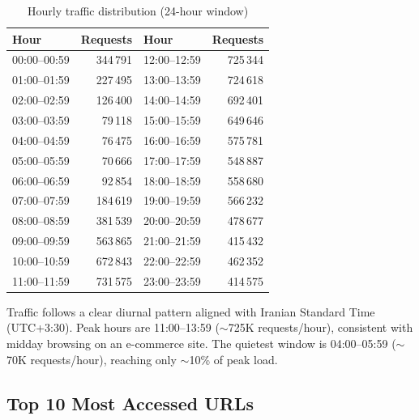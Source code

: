 \documentclass[12pt,a4paper]{article}
\begin{document}
\begin{table}[H]
\centering
\caption{Hourly traffic distribution (24-hour window)}
\footnotesize
\begin{tabular}{@{}lr|lr@{}}
\hline
\textbf{Hour} & \textbf{Requests} & \textbf{Hour} & \textbf{Requests} \\ \hline
00:00--00:59 & 344\,791 & 12:00--12:59 & 725\,344 \\
01:00--01:59 & 227\,495 & 13:00--13:59 & 724\,618 \\
02:00--02:59 & 126\,400 & 14:00--14:59 & 692\,401 \\
03:00--03:59 & 79\,118  & 15:00--15:59 & 649\,646 \\
04:00--04:59 & 76\,475  & 16:00--16:59 & 575\,781 \\
05:00--05:59 & 70\,666  & 17:00--17:59 & 548\,887 \\
06:00--06:59 & 92\,854  & 18:00--18:59 & 558\,680 \\
07:00--07:59 & 184\,619 & 19:00--19:59 & 566\,232 \\
08:00--08:59 & 381\,539 & 20:00--20:59 & 478\,677 \\
09:00--09:59 & 563\,865 & 21:00--21:59 & 415\,432 \\
10:00--10:59 & 672\,843 & 22:00--22:59 & 462\,352 \\
11:00--11:59 & 731\,575 & 23:00--23:59 & 414\,575 \\
\hline
\end{tabular}
\end{table}

Traffic follows a clear diurnal pattern aligned with Iranian Standard Time (UTC+3:30). Peak hours are 11:00--13:59 ($\sim$725K requests/hour), consistent with midday browsing on an e-commerce site. The quietest window is 04:00--05:59 ($\sim$70K requests/hour), reaching only $\sim$10\% of peak load.

\subsection{Top 10 Most Accessed URLs}
\end{document}
